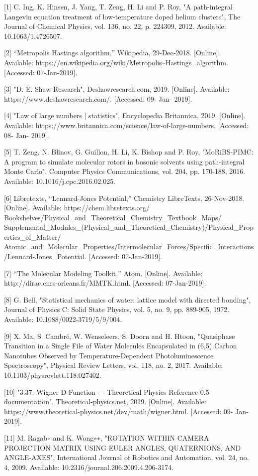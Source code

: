 \documentclass{ece}
\begin{document}
\normalsize{

[1] C. Ing, K. Hinsen, J. Yang, T. Zeng, H. Li and P. Roy, "A path-integral Langevin equation treatment of low-temperature doped helium clusters", The Journal of Chemical Physics, vol. 136, no. 22, p. 224309, 2012. Available: 10.1063/1.4726507.

[2] “Metropolis Hastings algorithm,” Wikipedia, 29-Dec-2018. [Online]. 
\\ Available: https://en.wikipedia.org/wiki/Metropolis–Hastings\_algorithm. [Accessed: 07-Jan-2019]. 

[3] "D. E. Shaw Research", Deshawresearch.com, 2019. [Online]. Available: https://www.deshawresearch.com/. [Accessed: 09- Jan- 2019].

[4] "Law of large numbers | statistics", Encyclopedia Britannica, 2019. [Online]. Available: https://www.britannica.com/science/law-of-large-numbers. [Accessed: 08- Jan- 2019].

[5] T. Zeng, N. Blinov, G. Guillon, H. Li, K. Bishop and P. Roy, "MoRiBS-PIMC: A program to simulate molecular rotors in bosonic solvents using path-integral Monte Carlo", Computer Physics Communications, vol. 204, pp. 170-188, 2016. Available: 10.1016/j.cpc.2016.02.025.

[6] Libretexts, “Lennard-Jones Potential,” Chemistry LibreTexts, 26-Nov-2018. [Online]. 
Available: https://chem.libretexts.org/
Bookshelves/Physical\_and\_Theoretical\_Chemistry\_Textbook\_Maps/
Supplemental\_Modules\_(Physical\_and\_Theoretical\_Chemistry)/Physical\_Properties\_of\_Matter/
\\ Atomic\_and\_Molecular\_Properties/Intermolecular\_Forces/Specific\_Interactions/Lennard-Jones\_Potential. 
[Accessed: 07-Jan-2019]. 

[7] “The Molecular Modeling Toolkit,” Atom. [Online]. Available: http://dirac.cnrs-orleans.fr/MMTK.html. [Accessed: 07-Jan-2019]. 

[8] G. Bell, "Statistical mechanics of water: lattice model with directed bonding", Journal of Physics C: Solid State Physics, vol. 5, no. 9, pp. 889-905, 1972. Available: 10.1088/0022-3719/5/9/004.

[9] X. Ma, S. Cambré, W. Wenseleers, S. Doorn and H. Htoon, "Quasiphase Transition in a Single File of Water Molecules Encapsulated in (6,5) Carbon Nanotubes Observed by Temperature-Dependent Photoluminescence Spectroscopy", Physical Review Letters, vol. 118, no. 2, 2017. Available: 10.1103/physrevlett.118.027402.

[10] "3.37. Wigner D Function — Theoretical Physics Reference 0.5 documentation", Theoretical-physics.net, 2019. [Online]. Available: https://www.theoretical-physics.net/dev/math/wigner.html. [Accessed: 09- Jan- 2019].

[11] M. Ragab∗ and K. Wong∗∗, "ROTATION WITHIN CAMERA PROJECTION MATRIX USING EULER ANGLES, QUATERNIONS, AND ANGLE-AXES", International Journal of Robotics and Automation, vol. 24, no. 4, 2009. Available: 10.2316/journal.206.2009.4.206-3174.

}
\end{document}
